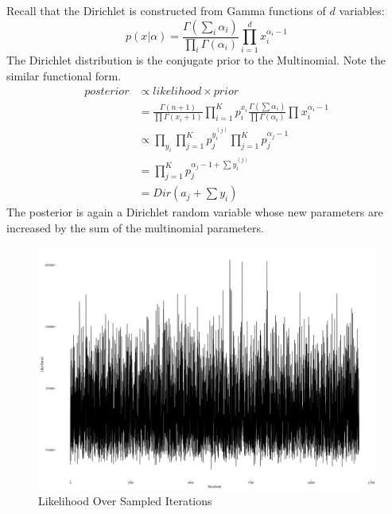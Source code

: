 \documentclass{article}%
\theoremstyle{definition}
\begin{document}
Recall that the Dirichlet is constructed from Gamma functions of $d$ variables:
\begin{equation*}
p(x|\alpha) = \frac{\Gamma(\sum_i \alpha_i)}{\prod_i \Gamma(\alpha_i)}\prod\limits_{i=1}^{d}x_i^{\alpha_i-1}
\end{equation*}
The Dirichlet distribution is the conjugate prior to the Multinomial. Note the similar functional form. 
\begin{align*}
posterior &\propto likelihood \times prior \\
&= \frac{\Gamma(n+1)}{\prod \Gamma(x_i+1)} \prod\limits_{i=1}^{K}p_i^{x_i}\frac{\Gamma(\sum \alpha_i)}{\prod \Gamma(\alpha_i)}\prod\limits_{}^{}x_i^{\alpha_i-1} \\
&\propto \prod_{y_i}\prod_{j=1}^{K}p_j^{y_i^{(j)}}\prod\limits_{j=1}^{K} p_j^{\alpha_j-1}\\
&= \prod\limits_{j=1}^{K} p_j^{\alpha_j-1 + \sum y_i^{(j)}}\\
&= Dir(a_j + \sum y_i)
\end{align*}
The posterior is again a Dirichlet random variable whose new parameters are increased by the sum of the multinomial parameters.


\begin{figure}[h]
  \caption{Likelihood Over Sampled Iterations}
  \centering
    \includegraphics[width=1\textwidth]{Likelihood}
\end{figure}
\end{document}
